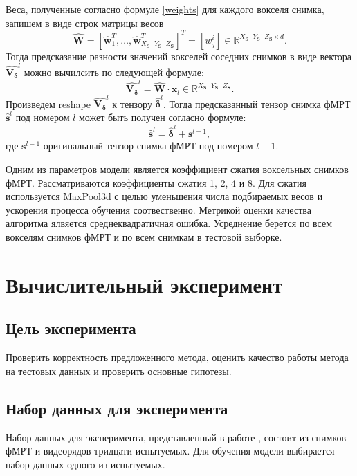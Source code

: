 \documentclass[12pt,twoside]{article}
\begin{document}
Веса, полученные согласно формуле \eqref{weights} для каждого вокселя снимка, запишем в виде строк матрицы весов
\begin{equation}
\label{matrix_weights}
    \hat{\bm{W}} = [\hat{\bm{w}}_1^T, \dots, \hat{\bm{w}}_{X_{\bm{S}} \cdot Y_{\bm{S}} \cdot Z_{\bm{S}}}^T]^T = [w^i_j] \in \mathbb{R}^{X_{\bm{S}} \cdot Y_{\bm{S}} \cdot Z_{\bm{S}} \times d}.
\end{equation}
Тогда предсказание разности значений вокселей соседних снимков в виде вектора $\hat{\bm{{V_{\delta}}}}^l$ можно вычилсить по следующей формуле:
\begin{equation}
\label{Vector_delta}
    \hat{\bm{{V_{\delta}}}}^l = \hat{\bm{W}} \cdot \bm{x}_l \in \mathbb{R}^{X_{\bm{S}} \cdot Y_{\bm{S}} \cdot Z_{\bm{S}}}.
\end{equation}
Произведем reshape $\hat{\bm{{V_{\delta}}}}^l$ к тензору $\hat{\bm{\delta}}^l$. Тогда предсказанный тензор снимка фМРТ $\hat{\bm{s}}^l$ под номером $l$ может быть получен согласно формуле:
\begin{equation}
    \label{Vector_delta}
    \hat{\bm{s}}^l = \hat{\bm{\delta}}^l + \bm{s}^{l-1},
\end{equation}
где $\bm{s}^{l-1}$ оригинальный тензор снимка фМРТ под номером $l-1$.


Одним из параметров модели является коэффициент сжатия воксельных снимков фМРТ. 
Рассматриваются коэффициенты сжатия 1, 2, 4 и 8.
Для сжатия используется MaxPool3d с целью уменьшения числа подбираемых весов и ускорения процесса обучения соотвественно.
Метрикой оценки качества алгоритма ялвяется среднеквадратичная ошибка.
Усреднение берется по всем вокселям снимков фМРТ и по всем снимкам в тестовой выборке.


\section{Вычислительный эксперимент}
\subsection{Цель эксперимента}
Проверить корректность предложенного метода, оценить качество работы метода на тестовых данных и проверить основные гипотезы.
\subsection{Набор данных для эксперимента}
Набор данных для эксперимента, представленный в работе \citep{Berezutskaya2022}, состоит из снимков фМРТ и видеорядов тридцати испытуемых. 
Для обучения модели выбирается набор данных одного из испытуемых. 
\end{document}
